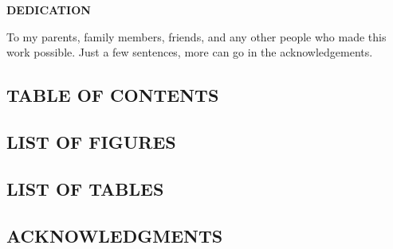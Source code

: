 \documentclass[12pt]{article}
\begin{document}
\newpage
\begin{center}
\hspace{0pt}
\vfill
\uppercase{{\bf Dedication}}

To my parents, family members, friends, and any other people who made this work possible.
Just a few sentences, more can go in the acknowledgements.
\vfill
\hspace{0pt}
\end{center}
\newpage
\renewcommand{\contentsname}{}
\begin{center}
\section*{\uppercase{Table of Contents}}
\end{center}

\tableofcontents
{}
\newpage
\renewcommand{\listfigurename}{}
\begin{center}
\section*{\uppercase{List of Figures}}
\end{center}
\listoffigures
{}
\newpage
\renewcommand{\listtablename}{}
\begin{center}
\section*{\uppercase{List of Tables}}
\end{center}
\listoftables
{}
\newpage
\begin{center}
\section*{\uppercase{Acknowledgments}}
\end{center}
\end{document}
